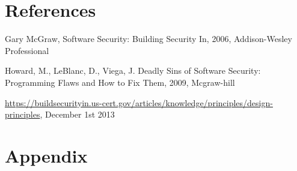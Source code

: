 \documentclass[a4paper]{article}
\begin{document}
\newpage
\section{References}
\begin{thebibliography}{9}
Gary McGraw,
Software Security: Building Security In,
2006,
Addison-Wesley Professional 

Howard, M., LeBlanc, D., Viega, J.
Deadly Sins of Software Security: Programming Flaws and How to Fix Them,
2009,
Mcgraw-hill

\href{https://buildsecurityin.us-cert.gov/articles/knowledge/principles/design-principles}{https://buildsecurityin.us-cert.gov/articles/knowledge/principles/design-principles}, December 1st 2013
\end{thebibliography}

\newpage
\section{Appendix}
\end{document}
